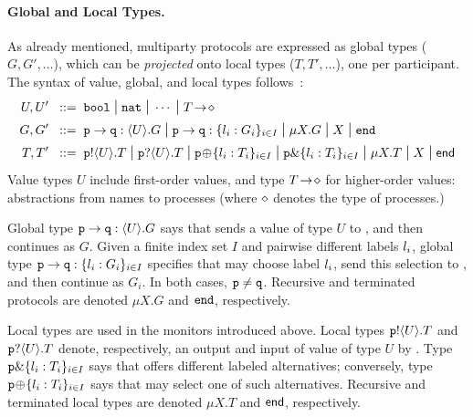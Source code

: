 \documentclass[runningheads,plain]{llncs}
\begin{document}
\paragraph{Global and Local Types.}
As already mentioned,  multiparty protocols are expressed as global types ($G, G', \ldots$), which can be \emph{projected} onto local types  ($T, T', \ldots$), one per participant. The syntax 
of value, global, and local types
follows~\cite{DBLP:conf/popl/HondaYC08}:
\begin{align*}
			U, U'  \bnfis & \bool \sbnfbar \nat \sbnfbar \cdots %
			\sbnfbar \shot{T} \\
			G, G'  \bnfis & \gtcom{p}{q}{U}{G} %
			\sbnfbar
			\gtcho{p}{q}{\lbl_i}{G_i} %
			\sbnfbar %
			\mu X. G \sbnfbar X \sbnfbar \gend \\
	    	T, T'  \bnfis & \ltout{p}{U}{T} \sbnfbar \ltinp{p}{U}{T} %
		  \sbnfbar %
		  \ltsel{p}{\lbl_i}{T_i}{i}{I} \sbnfbar \ltbra{p}{\lbl_i}{T_i}{i}{I}  
		\sbnfbar  \mu X. T \sbnfbar X \sbnfbar \lend 
\end{align*}
\noindent
Value types $U$ include first-order values,   and  
 type $T\! \rightarrow\! \diamond$ for {higher-order} values: abstractions from names to processes
(where $\diamond$ denotes the type of processes.)

Global type $\mathtt{p}\to\mathtt{q}:\langle U\rangle.G$ says that \p  sends a value of type $U$ to \q, and then continues as $G$.
Given a finite index set $I$ and pairwise different {labels} $l_i$, global type $\mathtt{p}\to\mathtt{q}:\{l_i:G_i\}_{i \in I}$ specifies that  \p may choose  label $l_i$, send this selection to \q, and then continue as $G_i$.
In both cases, $\mathtt{p} \neq \mathtt{q}$.
Recursive and terminated protocols are denoted $\mu X. G$ and $\mathtt{end}$, respectively.

Local types are used in the monitors introduced above. 
Local types
$\mathtt{p}!\langle U\rangle.T$ and $\mathtt{p}?\langle U\rangle.T$ denote, respectively, an output and input of value of type $U$ by \p.
Type $\mathtt{p}\&\{l_i: T_i\}_{i \in I}$ says that \p 
offers different labeled alternatives;
conversely, type $\mathtt{\mathtt{p}}\!\oplus\!\{l_i: T_i\}_{i \in I}$ 
says that \p may select one of such alternatives.
Recursive and terminated local types are denoted $\mu X. T$ and $\mathsf{end}$, respectively. 
 
\end{document}
